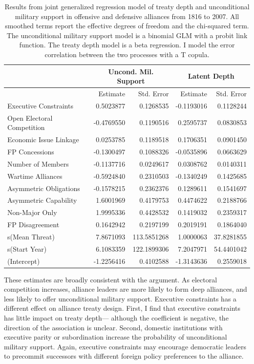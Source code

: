 \documentclass[12pt]{article}
\begin{document}
\begin{table}[ht]
\centering
\begin{tabular}{lrrrr}
  & \multicolumn{2}{c}{Uncond. Mil. Support} & \multicolumn{2}{c}{Latent Depth}\\ \hline
  & Estimate & Std. Error & Estimate & Std. Error \\ 
  \hline
  Executive Constraints & 0.5023877 & 0.1268535 & -0.1193016 & 0.1128244 \\ 
  Open Electoral Competition & -0.4769550 & 0.1190516 & 0.2595737 & 0.0830853 \\ 
  Economic Issue Linkage & 0.0253785 & 0.1189518 & 0.1706351 & 0.0901450 \\ 
  FP Concessions & -0.1300497 & 0.1088326 & -0.0535896 & 0.0663629 \\ 
  Number of Members & -0.1137716 & 0.0249617 & 0.0308762 & 0.0140311 \\ 
  Wartime Alliances & -0.5924840 & 0.2310503 & -0.1340249 & 0.1425685 \\ 
  Asymmetric Obligations & -0.1578215 & 0.2362376 & 0.1289611 & 0.1541697 \\ 
  Asymmetric Capability & 1.6001969 & 0.4179753 & 0.4474622 & 0.2188766 \\ 
  Non-Major Only & 1.9995336 & 0.4428532 & 0.1419032 & 0.2359317 \\ 
  FP Disagreement & 0.1642942 & 0.2197199 & 0.2019191 & 0.1864040 \\ 
  s(Mean Threat) & 7.8671093 & 113.5851268 & 1.0000063 & 37.8281855 \\ 
  s(Start Year) & 6.1083359 & 122.1899306 & 7.2047971 & 54.4401042 \\ 
  (Intercept) & -1.2256416 & 0.4102588 & -1.3143636 & 0.2559018 \\ 
   \hline
\end{tabular}
\caption{Results from joint generalized regression model of treaty depth and unconditional military support in offensive and defensive alliances from 1816 to 2007. 
                     All smoothed terms report the effective degrees of freedom and the chi-squared term. 
                     The unconditional military support model is a binomial GLM with a probit link function. 
                     The treaty depth model is a beta regression. 
                     I model the error correlation between the two processes with a T copula.} 
\label{tab:gjrm-res}
\end{table}


These estimates are broadly consistent with the argument. 
As electoral competition increases, alliance leaders are more likely to form deep alliances, and less likely to offer unconditional military support. 
Executive constraints has a different effect on alliance treaty design.
First, I find that executive constraints has little impact on treaty depth--- although the coefficient is negative, the direction of the association is unclear.  
Second, domestic institutions with executive parity or subordination increase the probability of unconditional military support.  
Again, executive constraints may encourage democratic leaders to precommit successors with different foreign policy preferences to the alliance. 
\end{document}
